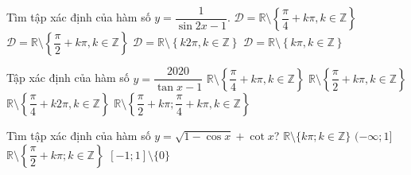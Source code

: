 \begin{ex}%
	Tìm tập xác định của hàm số $y=\dfrac{1}{\sin  2x-1}$.
	\choice 
		 {\True $\mathscr{D}=\mathbb{R}\setminus\left\{\dfrac{\pi}{4}+k\pi ,k\in\mathbb{Z}\right\}$}
		{$\mathscr{D}=\mathbb{R}\setminus\left\{\dfrac{\pi}{2}+k\pi ,k\in\mathbb{Z}\right\}$} 
		{$\mathscr{D}=\mathbb{R}\setminus\left\{  k2\pi ,k\in\mathbb{Z}\right\}$}
		{$\mathscr{D}=\mathbb{R}\setminus\left\{ k\pi ,k\in\mathbb{Z}\right\}$} 
\end{ex}

\begin{ex}%
	 Tập xác định của hàm số $ y=\dfrac{2020}{\tan x-1}$
	 \choice
		{$\mathbb{R}\setminus\left\{\dfrac{\pi}{4}+k\pi,  k\in\mathbb{Z}\right\}$}
		 {$\mathbb{R}\setminus\left\{\dfrac{\pi}{2}+k\pi, k\in\mathbb{Z}\right\}$}
		{$\mathbb{R}\setminus\left\{\dfrac{\pi}{4}+k2\pi,  k\in\mathbb{Z}\right\}$}
		{\True $\mathbb{R}\setminus\left\{\dfrac{\pi}{2}+k\pi; \dfrac{\pi}{4}+k\pi  ,k\in\mathbb{Z}\right\}$}
\end{ex}

\begin{ex}%
	Tìm tập xác định  của hàm số $y=\sqrt{1-\cos x}+\cot x$?
	\choice 
		{\True  $\mathbb{R}\setminus \{k\pi; k\in\mathbb{Z}\}$}
		 {$(-\infty;1]$}
		{$\mathbb{R}\setminus\left\{\dfrac{\pi}{2}+k\pi; k\in\mathbb{Z}\right\}$} 
		{$[-1;1]\setminus \{0\}$} 
\end{ex}

